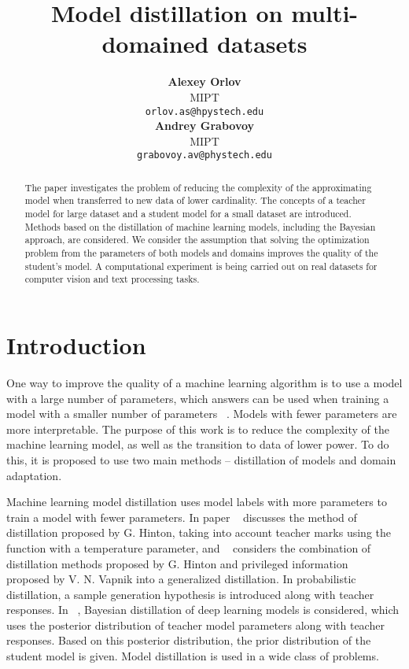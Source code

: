 \documentclass[12pt]{article}
\title{Model distillation on multi-domained datasets}
\author{ \textbf{Alexey Orlov}\\
	MIPT\\
        \texttt{orlov.as@hpystech.edu}\\
	\And
	\textbf{Andrey Grabovoy} \\
	MIPT\\
        \texttt{grabovoy.av@phystech.edu}\\
}
\date{}
\begin{document}
\maketitle

\begin{abstract}
	The paper investigates the problem of reducing the complexity of the approximating model when transferred to new data of lower cardinality. The concepts of a teacher model for large dataset and a student model for a small dataset are introduced. Methods based on the distillation of machine learning models, including the Bayesian approach, are considered. We consider the assumption that solving the optimization problem from the parameters of both models and domains improves the quality of the student's model. A computational experiment is being carried out on real datasets for computer vision and text processing tasks.
\end{abstract}




\section{Introduction}

One way to improve the quality of a machine learning algorithm is to use a model with a large number of parameters, which answers can be used when training a model with a smaller number of parameters ~\cite{Hinton2015}. Models with fewer parameters are more interpretable. The purpose of this work is to reduce the complexity of the machine learning model, as well as the transition to data of lower power. To do this, it is proposed to use two main methods -- distillation of models and domain adaptation.



Machine learning model distillation uses model labels with more parameters to train a model with fewer parameters. In paper ~\cite{Hinton2015} discusses the method of distillation proposed by G. Hinton, taking into account teacher marks using the function  with a temperature parameter, and ~\cite{Vapnik2016} considers the combination of distillation methods proposed by G. Hinton and privileged information ~\cite{Vapnik2016} proposed by V. N. Vapnik into a generalized distillation. In probabilistic distillation, a sample generation hypothesis is introduced along with teacher responses. In ~\cite{Grabovoy2021}, Bayesian distillation of deep learning models is considered, which uses the posterior distribution of teacher model parameters along with teacher responses. Based on this posterior distribution, the prior distribution of the student model is given. Model distillation is used in a wide class of problems. 
\end{document}
